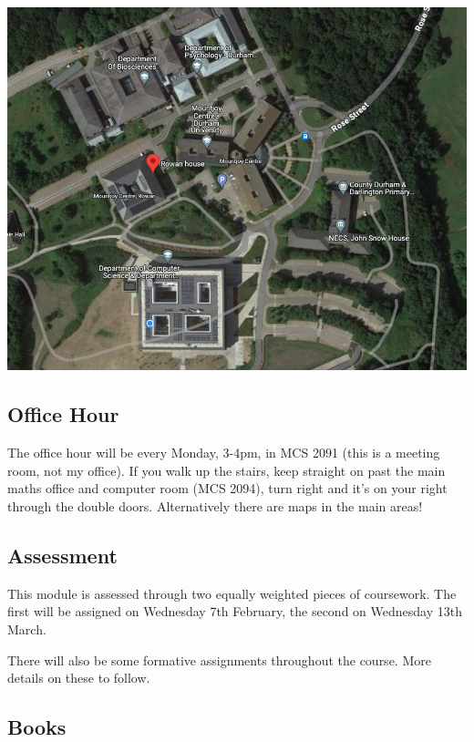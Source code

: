 \documentclass[
  openany]{book}
\theoremstyle{definition}
\theoremstyle{definition}
\theoremstyle{definition}
\theoremstyle{definition}
\theoremstyle{remark}
\begin{document}
\includegraphics{images/rowanhouse_map.png}

\hypertarget{office-hour}{%
\subsection*{Office Hour}\label{office-hour}}

The office hour will be every Monday, 3-4pm, in MCS 2091 (this is a meeting room, not my office). If you walk up the stairs, keep straight on past the main maths office and computer room (MCS 2094), turn right and it's on your right through the double doors. Alternatively there are maps in the main areas!

\hypertarget{assessment}{%
\subsection*{Assessment}\label{assessment}}

This module is assessed through two equally weighted pieces of coursework. The first will be assigned on Wednesday 7th February, the second on Wednesday 13th March.

There will also be some formative assignments throughout the course. More details on these to follow.

\hypertarget{books}{%
\subsection*{Books}\label{books}}
\end{document}
